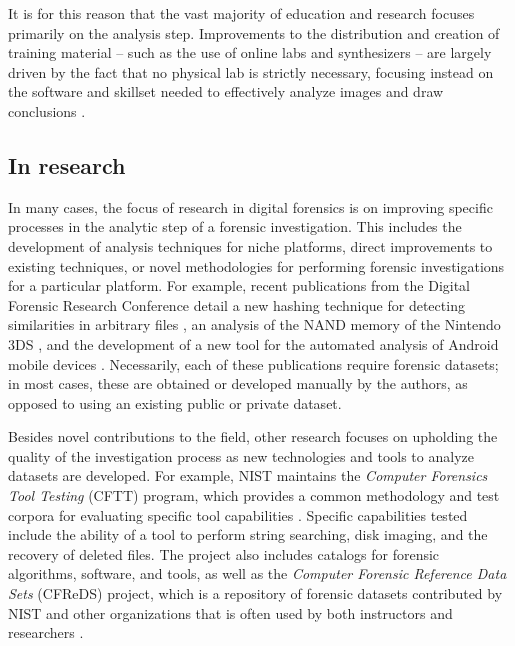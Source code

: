 \documentclass[letterpaper,12pt]{report}
\begin{document}
It is for this reason that the vast majority of education and research
focuses primarily on the analysis step. Improvements to the distribution
and creation of training material -- such as the use of online labs and
synthesizers -- are largely driven by the fact that no physical lab is
strictly necessary, focusing instead on the software and skillset needed
to effectively analyze images and draw conclusions
\cite{bruecknerAutomatedComputerForensics2008,lawrenceFrameworkDesignWebbased2009}.

\subsection{In research}\label{in-research}

In many cases, the focus of research in digital forensics is on
improving specific processes in the analytic step of a forensic
investigation. This includes the development of analysis techniques for
niche platforms, direct improvements to existing techniques, or novel
methodologies for performing forensic investigations for a particular
platform. For example, recent publications from the Digital Forensic
Research Conference detail a new hashing technique for detecting
similarities in arbitrary files \cite{changFbHashNewSimilarity2019},
an analysis of the NAND memory of the Nintendo 3DS
\cite{pessolanoForensicAnalysisNintendo2019}, and the development of
a new tool for the automated analysis of Android mobile devices
\cite{linAutomatedForensicAnalysis2018}. Necessarily, each of these
publications require forensic datasets; in most cases, these are
obtained or developed manually by the authors, as opposed to using an
existing public or private dataset.

Besides novel contributions to the field, other research focuses on
upholding the quality of the investigation process as new technologies
and tools to analyze datasets are developed. For example, NIST maintains
the \emph{Computer Forensics Tool Testing} (CFTT) program, which
provides a common methodology and test corpora for evaluating specific
tool capabilities
\cite{nationalinstituteofstandardsandtechnologyComputerForensicsTool2017}.
Specific capabilities tested include the ability of a tool to perform
string searching, disk imaging, and the recovery of deleted files. The
project also includes catalogs for forensic algorithms, software, and
tools, as well as the \emph{Computer Forensic Reference Data Sets}
(CFReDS) project, which is a repository of forensic datasets contributed
by NIST and other organizations that is often used by both instructors
and researchers
\cite{nationalinstituteofstandardsandtechnologyCFReDSPortal}.
\end{document}
